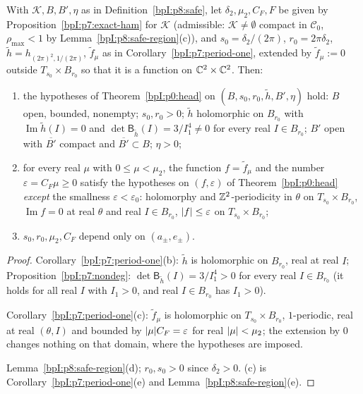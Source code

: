 \begin{proposition}\label{bpI:p8:head-data}
With $\mathcal K,B,B',\eta$ as in Definition~\ref{bpI:p8:safe}, let $\delta_2,\mu_2,C_F,F$ be given by Proposition~\ref{bpI:p7:exact-ham} for $\mathcal K$ (admissible: $\mathcal K\ne\emptyset$ compact in $\mathcal C_0$, $\rho_{\max}<1$ by Lemma~\ref{bpI:p8:safe-region}(c)), and $s_0=\delta_2/(2\pi)$, $r_0=2\pi\delta_2$, $\tilde h=h_{(2\pi)^2,1/(2\pi)}$, $\tilde f_\mu$ as in Corollary~\ref{bpI:p7:period-one}, extended by $\tilde f_\mu:=0$ outside $T_{s_0}\times B_{r_0}$ so that it is a function on $\mathbb{C}^2\times\mathbb{C}^2$. Then:
\begin{enumerate}[label=(\alph*)]
\item the hypotheses of Theorem~\ref{bpI:p0:head} on $(B,s_0,r_0,\tilde h,B',\eta)$ hold: $B$ open, bounded, nonempty; $s_0,r_0>0$; $\tilde h$ holomorphic on $B_{r_0}$ with $\operatorname{Im}\tilde h(I)=0$ and $\det\mathsf B_{\tilde h}(I)=3/I_1^4\neq0$ for every real $I\in B_{r_0}$; $B'$ open with $\overline{B'}$ compact and $\overline{B'}\subset B$; $\eta>0$;
\item for every real $\mu$ with $0\le\mu<\mu_2$, the function $f=\tilde f_\mu$ and the number $\varepsilon=C_F\mu\ge0$ satisfy the hypotheses on $(f,\varepsilon)$ of Theorem~\ref{bpI:p0:head} \emph{except} the smallness $\varepsilon<\varepsilon_0$: holomorphy and $\mathbb{Z}^2$-periodicity in $\theta$ on $T_{s_0}\times B_{r_0}$, $\operatorname{Im}f=0$ at real $\theta$ and real $I\in B_{r_0}$, $\lvert f\rvert\le\varepsilon$ on $T_{s_0}\times B_{r_0}$;
\item $s_0,r_0,\mu_2,C_F$ depend only on $(a_\pm,e_\pm)$.
\end{enumerate}
\end{proposition}
\begin{proof}
\label{stepI:p8:hd-h} Corollary~\ref{bpI:p7:period-one}(b): $\tilde h$ is holomorphic on $B_{r_0}$, real at real $I$; Proposition~\ref{bpI:p7:nondeg}: $\det\mathsf B_{\tilde h}(I)=3/I_1^4>0$ for every real $I\in B_{r_0}$ (it holds for all real $I$ with $I_1>0$, and real $I\in B_{r_0}$ has $I_1>0$).

\label{stepI:p8:hd-f} Corollary~\ref{bpI:p7:period-one}(c): $\tilde f_\mu$ is holomorphic on $T_{s_0}\times B_{r_0}$, $1$-periodic, real at real $(\theta,I)$ and bounded by $\lvert \mu\rvert C_F=\varepsilon$ for real $\lvert \mu\rvert<\mu_2$; the extension by $0$ changes nothing on that domain, where the hypotheses are imposed.

\label{stepI:p8:hd-sets} Lemma~\ref{bpI:p8:safe-region}(d); $r_0,s_0>0$ since $\delta_2>0$. (c) is Corollary~\ref{bpI:p7:period-one}(e) and Lemma~\ref{bpI:p8:safe-region}(e).
\end{proof}


